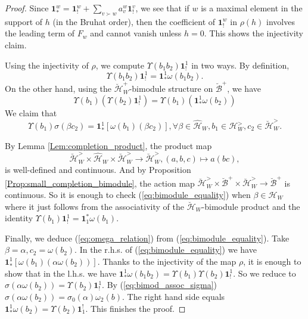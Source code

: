 \documentclass{amsart}
\newcommand{\Hecke}{\mathcal{H}}
\newcommand{\bone}{\mathbf{1}}
\newcommand{\B}{\mathcal{B}}
\theoremstyle{definition}
\numberwithin{equation}{section}
\begin{document}
\begin{proof}
Since $\bone_*^w = \bone_!^w + \sum_{v\succ w} a_v^w \bone_!^v$, we see that if $w$ is a maximal element in the support of $h$ (in the Bruhat order), then the coefficient of $\bone_!^w$ in $\rho(h)$ involves the leading term of $F_w$ and cannot vanish unless $h=0$. This shows the injectivity claim.

Using the injectivity of $\rho$, we compute $\Upsilon(b_1 b_2)\bone_!^1$ in two ways. By definition,
$$\Upsilon(b_1 b_2)\bone_!^1 = \bone_*^1 \omega(b_1 b_2).$$
On the other hand, using the $\breve{\Hecke}^+_W$-bimodule structure on $\breve{\B}^+$, we have
$$\Upsilon(b_1) (\Upsilon(b_2) \bone_!^1) = \Upsilon(b_1) (\bone_*^1 \omega(b_2))$$
We claim that
\begin{equation}\label{eq:bimodule_equality}
\Upsilon(b_1) \sigma(\beta c_2)=\bone_*^1[\omega(b_1)(\beta c_2)], \forall \beta\in \widehat{\mathcal{H}}_W, b_1\in \Hecke^>_W, c_2\in \breve{\Hecke}^>_W.\end{equation}

By Lemma \ref{Lem:completion_product}, the product map
$$\breve{\Hecke}^>_W\times \widehat{\Hecke}_W\times \breve{\Hecke}^>_{W}\rightarrow \breve{\Hecke}^>_W, (a,b,c)\mapsto a(bc),$$
is well-defined and continuous. And by Proposition \ref{Prop:small_completion_bimodule}, the action map $\breve{\Hecke}_W^>\times \breve{\B}^+\times \breve{\Hecke}_W^>\rightarrow \breve{\B}^+$ is continuous. 
So it is enough to check (\ref{eq:bimodule_equality}) when $\beta\in \Hecke_W$ where it just follows from the associativity of the $\breve{\Hecke}_W$-bimodule product and the identity $\Upsilon(b_1)\bone^1_!=\bone^*_1\omega(b_1)$.

Finally, we deduce (\ref{eq:omega_relation}) from
(\ref{eq:bimodule_equality}). Take $\beta=\alpha, c_2=\omega(b_2)$. In the r.h.s. of (\ref{eq:bimodule_equality}) we have $\bone^1_* [\omega(b_1)(\alpha\omega(b_2))]$. Thanks to the injectivity of the map $\rho$, it is enough to show that in the l.h.s. we have $\bone^1_*\omega(b_1b_2)=\Upsilon(b_1)\Upsilon(b_2)\bone^1_!$. So we reduce to $\sigma(\alpha\omega(b_2))=\Upsilon(b_2)\bone^1_!$. By (\ref{eq:bimod_assoc_sigma}) $\sigma(\alpha\omega(b_2))=\sigma_0(\alpha)\omega_2(b)$. The right hand side equals $\bone^1_*\omega(b_2)=\Upsilon(b_2)\bone^!_1$. This finishes the proof. 
\end{proof}
\end{document}
